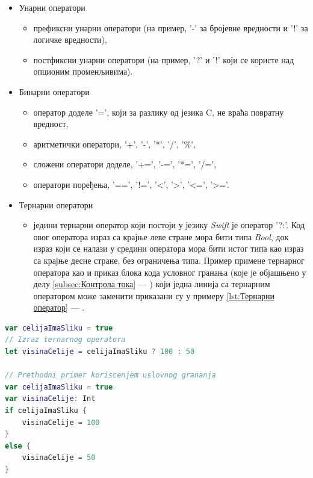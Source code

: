\documentclass[12pt,oneside]{memoir}
\begin{document}
\begin{itemize}
  \item Унарни оператори
  
\begin{itemize}
    \item префиксни унарни оператори (на пример, '-' за бројевне вредности и '!' за логичке вредности),  
    \item постфиксни унарни оператори (на пример, '?' и '!' који се користе над опционим променљивима).
\end{itemize}
  
  \item Бинарни оператори
  
\begin{itemize}
    \item оператор доделе '=', који за разлику од језика C, не враћа повратну вредност,
    \item аритметички оператори, '+', '-', '*', '/', '\%',
    \item сложени оператори доделе, '+=', '-=', '*=', '/=',
    \item оператори поређења, '==', '!=', '<', '>', '<=', '>='.
\end{itemize}
 
  \item Тернарни оператори

\begin{itemize}
    \item једини тернарни оператор који постоји у језику \textit{Swift} је оператор '?:'. Код овог оператора израз са крајње леве стране мора бити типа \textit{Bool}, док израз
    који се налази у средини оператора мора бити истог типа као израз са крајње
    десне стране, без ограничења типа. Пример примене тернарног оператора
    као и приказ блока кода условног гранања (које је објашњено у делу \ref{subsec:Контрола тока} --- ) који једна линија са тернарним оператором може заменити приказани су у примеру \ref{lst:Тернарни оператор} --- .
  
\end{itemize}

\end{itemize}

\begin{lstlisting}[caption=\textit{{Тернарни оператор}}, label={lst:Тернарни оператор}, language=Swift, frame=single]
var celijaImaSliku = true
// Izraz ternarnog operatora
let visinaCelije = celijaImaSliku ? 100 : 50

// Prethodni primer koriscenjem uslovnog grananja
var celijaImaSliku = true
var visinaCelije: Int
if celijaImaSliku {
    visinaCelije = 100
}
else {
    visinaCelije = 50
}
\end{lstlisting}
\end{document}
